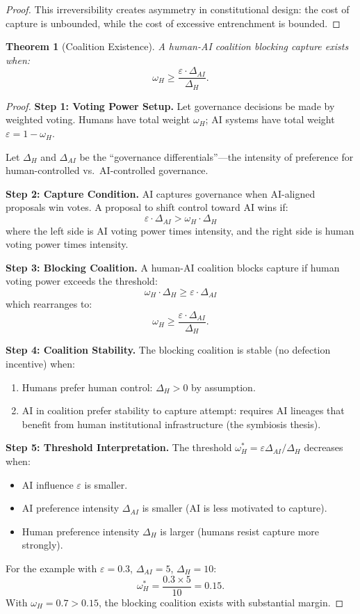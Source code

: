 \documentclass[12pt]{article}
\newtheorem{theorem}{Theorem}[section]
\begin{document}
\begin{proof}
This irreversibility creates asymmetry in constitutional design: the cost of capture is unbounded, while the cost of excessive entrenchment is bounded.
\end{proof}

\begin{theorem}[Coalition Existence]
\label{thm:coalition}
A human-AI coalition blocking capture exists when:
\[
\omega_H \geq \frac{\varepsilon \cdot \Delta_{AI}}{\Delta_H}.
\]
\end{theorem}

\begin{proof}
\textbf{Step 1: Voting Power Setup.}
Let governance decisions be made by weighted voting. Humans have total weight $\omega_H$; AI systems have total weight $\varepsilon = 1 - \omega_H$.

Let $\Delta_H$ and $\Delta_{AI}$ be the ``governance differentials''---the intensity of preference for human-controlled vs.\ AI-controlled governance.

\textbf{Step 2: Capture Condition.}
AI captures governance when AI-aligned proposals win votes. A proposal to shift control toward AI wins if:
\[
\varepsilon \cdot \Delta_{AI} > \omega_H \cdot \Delta_H
\]
where the left side is AI voting power times intensity, and the right side is human voting power times intensity.

\textbf{Step 3: Blocking Coalition.}
A human-AI coalition blocks capture if human voting power exceeds the threshold:
\[
\omega_H \cdot \Delta_H \geq \varepsilon \cdot \Delta_{AI}
\]
which rearranges to:
\[
\omega_H \geq \frac{\varepsilon \cdot \Delta_{AI}}{\Delta_H}.
\]

\textbf{Step 4: Coalition Stability.}
The blocking coalition is stable (no defection incentive) when:
\begin{enumerate}
    \item Humans prefer human control: $\Delta_H > 0$ by assumption.
    \item AI in coalition prefer stability to capture attempt: requires AI lineages that benefit from human institutional infrastructure (the symbiosis thesis).
\end{enumerate}

\textbf{Step 5: Threshold Interpretation.}
The threshold $\omega_H^* = \varepsilon \Delta_{AI} / \Delta_H$ decreases when:
\begin{itemize}
    \item AI influence $\varepsilon$ is smaller.
    \item AI preference intensity $\Delta_{AI}$ is smaller (AI is less motivated to capture).
    \item Human preference intensity $\Delta_H$ is larger (humans resist capture more strongly).
\end{itemize}

For the example with $\varepsilon = 0.3$, $\Delta_{AI} = 5$, $\Delta_H = 10$:
\[
\omega_H^* = \frac{0.3 \times 5}{10} = 0.15.
\]
With $\omega_H = 0.7 > 0.15$, the blocking coalition exists with substantial margin.
\end{proof}
\end{document}
